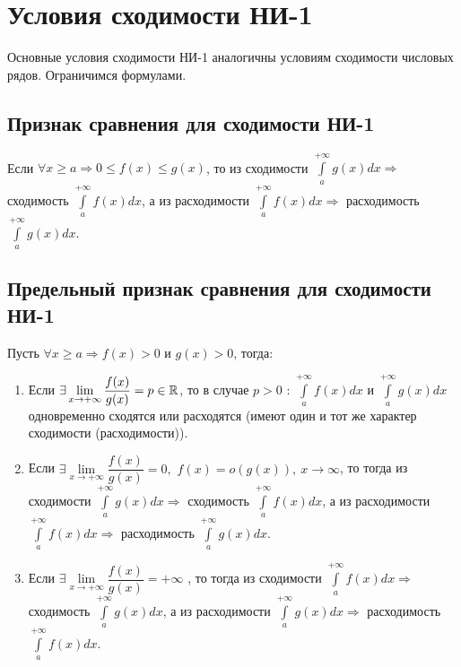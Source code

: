 \documentclass[../../main.tex]{subfiles}
\begin{document}
\section{Условия сходимости НИ-1}
Основные условия сходимости НИ-1 аналогичны условиям сходимости числовых рядов.
Ограничимся формулами.
\subsection{Признак сравнения для сходимости НИ-1}
Если $\forall x \geq a \Longrightarrow 0 \leq f(x) \leq g(x)$, то из
сходимости $\int\limits_a^{+\infty} g(x)dx \Longrightarrow$ сходимость
$\int\limits_a^{+\infty} f(x)dx$, а из расходимости
$\int\limits_a^{+\infty} f(x)dx \Longrightarrow$
расходимость $\int\limits_a^{+\infty} g(x)dx$.
\subsection{Предельный признак сравнения для сходимости НИ-1}
Пусть $\forall x \geq a \Longrightarrow f(x) > 0$ и $g(x) > 0$, тогда:
\begin{enumerate}
    \item Если $\exists \lim\limits_{x \to +\infty} \dfrac{f(x)}{g(x)} = p
    \in \mathbb{R}$, то в случае $p > 0$ :
    $\int\limits_a^{+\infty} f(x)dx$ и $\int\limits_a^{+\infty} g(x)dx $
    одновременно сходятся или расходятся (имеют один и тот же характер
    сходимости (расходимости)).
    \item Если $\exists \lim\limits_{x \to +\infty} \dfrac{f(x)}{g(x)} = 0,$
    $f(x) = o(g(x)), \ x \to \infty$, то тогда из сходимости
    $\int\limits_a^{+\infty} g(x)dx \Longrightarrow$ сходимость
    $\int\limits_a^{+\infty} f(x)dx$, а из расходимости
    $\int\limits_a^{+\infty} f(x)dx \Longrightarrow$ расходимость
    $\int\limits_a^{+\infty} g(x)dx$.
    \item Если $\exists \lim\limits_{x \to +\infty} \dfrac{f(x)}{g(x)} = +\infty$
    , то тогда из сходимости
    $\int\limits_a^{+\infty} f(x)dx \Longrightarrow$ сходимость
    $\int\limits_a^{+\infty} g(x)dx$, а из расходимости
    $\int\limits_a^{+\infty} g(x)dx \Longrightarrow$ расходимость
    $\int\limits_a^{+\infty} f(x)dx$.
\end{enumerate}

\begin{crl*}
\end{crl*}
\end{document}
